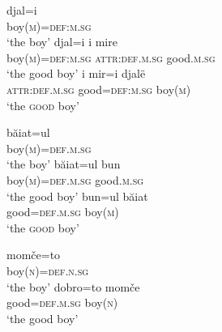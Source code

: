 \begin{exe}
\ex 
{} 
\begin{xlist}
\ex \label{definfl alb}
\gll	djal=i\\
	boy(\textsc{m})=\textsc{def:m.sg}\\
\glt	‘the boy’
\ex \label{encl alb a}
\gll	djal=i 				i 			mire\\
	boy(\textsc{m})=\textsc{def:m.sg} 	\textsc{attr:def.m.sg}	good.\textsc{m.sg}\\
\glt	‘the good boy’
\ex \label{encl alb b}
\gll	i 			mir=i 			djalë\\
	\textsc{attr:def.m.sg} 	good=\textsc{def:m.sg} 	boy(\textsc{m})\\
\glt	‘the \textsc{good} boy’ 
\end{xlist}
\ex 
{}
\begin{xlist}
\ex \label{definfl rum}
\gll	băiat=ul\\
	boy(\textsc{m})=\textsc{def.m.sg}\\
\glt	‘the boy’
\ex \label{encl rum a}
\gll	băiat=ul 				bun\\
	boy(\textsc{m})=\textsc{def.m.sg} 	good.\textsc{m.sg}\\
\glt	‘the good boy’
\ex \label{encl rum b}
\gll	bun=ul 				băiat\\
	good=\textsc{def.m.sg} 	boy(\textsc{m})\\
\glt	‘the \textsc{good} boy’
\end{xlist}
\ex
{}
\begin{xlist}
\ex \label{definfl bg}
\gll	momče=to\\
	boy(\textsc{n})=\textsc{def.n.sg}\\
\glt	‘the boy’
\ex \label{encl bg}
\gll	dobro=to 		momče\\
	good=\textsc{def.m.sg}	boy(\textsc{n})\\
\glt	‘the good boy’
\end{xlist}	
\end{exe}
